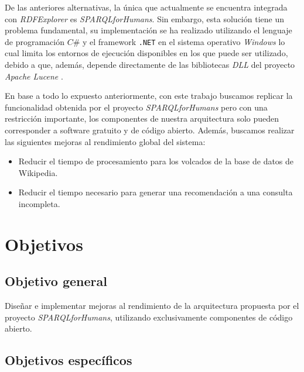 \documentclass[conference,compsoc]{IEEEtran}
\begin{document}
De las anteriores alternativas, la única que actualmente se encuentra integrada
con \textit{RDFExplorer} es \textit{SPARQLforHumans}. Sin embargo, esta solución
tiene un problema fundamental, su implementación se ha realizado utilizando el
lenguaje de programación $C\#$ y el framework \texttt{.NET} en el sistema
operativo \textit{Windows} lo cual limita los entornos de ejecución disponibles
en los que puede ser utilizado, debido a que, además, depende directamente de
las bibliotecas \textit{DLL} del proyecto \textit{Apache Lucene}
\cite{bialecki2012apache}.


En base a todo lo expuesto anteriormente, con este trabajo buscamos replicar la
funcionalidad obtenida por el proyecto \textit{SPARQLforHumans} pero con una
restricción importante, los componentes de nuestra arquitectura solo pueden
corresponder a software gratuito y de código abierto. Además, buscamos realizar
las siguientes mejoras al rendimiento global del sistema:

\begin{itemize}
    \item Reducir el tiempo de procesamiento para los volcados de la base de
    datos de Wikipedia.
    \item Reducir el tiempo necesario para generar una recomendación a una
    consulta \spql incompleta.
\end{itemize}

\section{Objetivos}

    \subsection{Objetivo general}

Diseñar e implementar mejoras al rendimiento de la arquitectura propuesta por el
proyecto \textit{SPARQLforHumans}, utilizando exclusivamente componentes de
código abierto.

    \subsection{Objetivos específicos}
\end{document}

